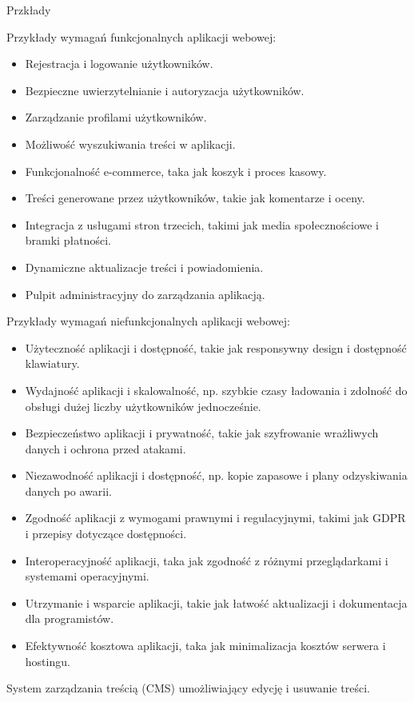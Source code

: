 Przkłady

\noindent Przykłady wymagań funkcjonalnych aplikacji webowej:
\begin{itemize}
    \item Rejestracja i logowanie użytkowników.
    \item Bezpieczne uwierzytelnianie i autoryzacja użytkowników.
    \item Zarządzanie profilami użytkowników.
    \item Możliwość wyszukiwania treści w aplikacji.
    \item Funkcjonalność e-commerce, taka jak koszyk i proces kasowy.
    \item Treści generowane przez użytkowników, takie jak komentarze i oceny.
    \item Integracja z usługami stron trzecich, takimi jak media społecznościowe i bramki płatności.
    \item Dynamiczne aktualizacje treści i powiadomienia.
    \item Pulpit administracyjny do zarządzania aplikacją.
\end{itemize}
\noindent Przykłady wymagań niefunkcjonalnych aplikacji webowej:
\begin{itemize}
    \item Użyteczność aplikacji i dostępność, takie jak responsywny design i dostępność klawiatury.
    \item Wydajność aplikacji i skalowalność, np. szybkie czasy ładowania i zdolność do obsługi dużej liczby użytkowników jednocześnie.
    \item Bezpieczeństwo aplikacji i prywatność, takie jak szyfrowanie wrażliwych danych i ochrona przed atakami.
    \item Niezawodność aplikacji i dostępność, np. kopie zapasowe i plany odzyskiwania danych po awarii.
    \item Zgodność aplikacji z wymogami prawnymi i regulacyjnymi, takimi jak GDPR i przepisy dotyczące dostępności.
    \item Interoperacyjność aplikacji, taka jak zgodność z różnymi przeglądarkami i systemami operacyjnymi.
    \item Utrzymanie i wsparcie aplikacji, takie jak łatwość aktualizacji i dokumentacja dla programistów.
    \item Efektywność kosztowa aplikacji, taka jak minimalizacja kosztów serwera i hostingu.
\end{itemize}
System zarządzania treścią (CMS) umożliwiający edycję i usuwanie treści.

